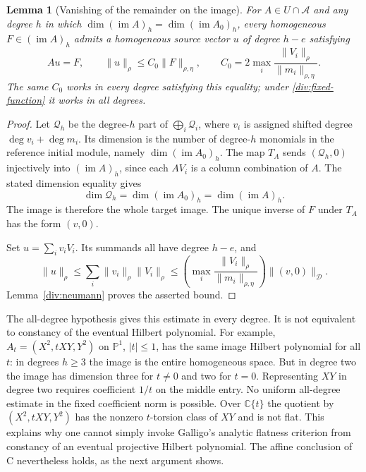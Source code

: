 \documentclass[11pt,reqno]{amsart}
\numberwithin{equation}{section}
\newtheorem{lemma}[theorem]{Lemma}
\theoremstyle{definition}
\theoremstyle{remark}
\newcommand{\C}{\mathbb C}
\begin{document}
\begin{lemma}[Vanishing of the remainder on the image]
\label{div:polynomial}
For \(A\in U\cap\mathcal A\) and any degree \(h\) in which
\(\dim(\operatorname{im}A)_h=\dim(\operatorname{im}A_0)_h\), every
homogeneous \(F\in(\operatorname{im}A)_h\) admits a homogeneous source vector
\(u\) of degree \(h-e\) satisfying
\begin{equation}
 Au=F,\qquad
 \|u\|_\rho\leq C_0\|F\|_{\rho,\eta},
 \qquad
 C_0=2\max_i\frac{\|V_i\|_\rho}{\|m_i\|_{\rho,\eta}}.
 \label{div:polynomial-bound}
\end{equation}
The same \(C_0\) works in every degree satisfying this equality; under
\eqref{div:fixed-function} it works in all degrees.
\end{lemma}

\begin{proof}
Let \(\mathcal Q_h\) be the degree-\(h\) part of
\(\bigoplus_i\mathcal Q_i\), where \(v_i\) is assigned shifted
degree \(\deg v_i+\deg m_i\).
Its dimension is the number of degree-\(h\) monomials in the
reference initial module, namely
\(\dim(\operatorname{im}A_0)_h\).
The map \(T_A\) sends \((\mathcal Q_h,0)\) injectively into
\((\operatorname{im}A)_h\), since each \(AV_i\) is a column
combination of \(A\). The stated dimension equality gives
\[
 \dim\mathcal Q_h
 =
 \dim(\operatorname{im}A_0)_h
 =
 \dim(\operatorname{im}A)_h.
\]
The image is therefore the whole target image. The unique inverse
of \(F\) under \(T_A\) has the form \((v,0)\).

Set \(u=\sum_i v_iV_i\). Its summands all have degree \(h-e\), and
\[
 \|u\|_\rho
 \leq\sum_i\|v_i\|_\rho\|V_i\|_\rho
 \leq
 \left(\max_i\frac{\|V_i\|_\rho}{\|m_i\|_{\rho,\eta}}\right)
 \|(v,0)\|_{\mathcal D}.
\]
Lemma~\ref{div:neumann} proves the asserted bound.
\end{proof}

The all-degree hypothesis gives this estimate in every degree. It is
not equivalent to constancy of the eventual Hilbert polynomial. For
example, $A_t=(X^2,tXY,Y^2)$ on $\mathbb P^1$, $|t|\le1$, has the
same image Hilbert polynomial for all $t$: in degrees $h\ge3$ the
image is the entire homogeneous space. But in degree two the image
has dimension three for $t\ne0$ and two for $t=0$. Representing $XY$
in degree two requires coefficient $1/t$ on the middle entry. No
uniform all-degree estimate in the fixed coefficient norm is possible.
Over $\C\{t\}$ the quotient by $(X^2,tXY,Y^2)$ has the nonzero
$t$-torsion class of $XY$ and is not flat. This explains why one
cannot simply invoke Galligo's analytic flatness criterion from
constancy of an eventual projective Hilbert polynomial. The affine
conclusion of C nevertheless holds, as the next argument shows.
\end{document}
